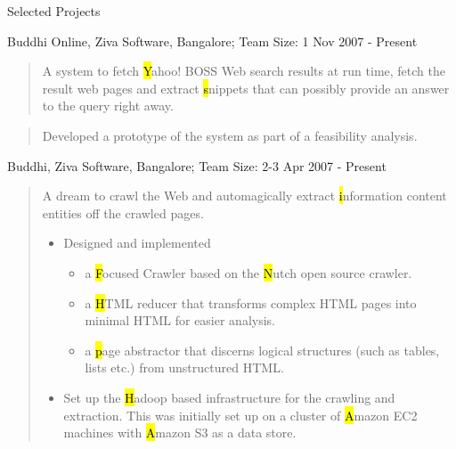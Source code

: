 \documentclass{resume}
\newcommand{\teamsize}{\sc\footnotesize Team Size: }
\begin{document}
\begin{category}{Selected Projects}{}

    \item {\topic Buddhi Online,} Ziva Software, Bangalore;
        {\teamsize 1}
        {\period Nov 2007 - Present}
        \begin{quotation}
            A system to fetch {\hl Yahoo! BOSS} Web search results at run time,
            fetch the result web pages and extract {\hl snippets} that can possibly
            provide an answer to the query right away.
        \end{quotation}
        \begin{quotation}
            Developed a prototype of the system as part of a feasibility analysis.
        \end{quotation}

    \item {\topic Buddhi,} Ziva Software, Bangalore;
        {\teamsize 2-3}
        {\period Apr 2007 - Present}
        \begin{quotation}
            A dream to crawl the Web and automagically extract {\hl information
            content entities} off the crawled pages.

            \begin{itemize}
                \item Designed and implemented
                    \begin{itemize}
                        \item a {\hl Focused Crawler} based on the {\hl Nutch} open
                            source crawler.
                        \item a {\hl HTML reducer} that transforms complex HTML
                            pages into minimal HTML for easier analysis.
                        \item a {\hl page abstractor} that discerns logical
                            structures (such as tables, lists etc.) from
                            unstructured HTML.
                    \end{itemize}
                \item Set up the {\hl Hadoop} based infrastructure for the crawling
                    and extraction.  This was initially set up on a cluster of {\hl
                    Amazon EC2} machines with {\hl Amazon S3} as a data store.
            \end{itemize}
        \end{quotation}


\end{category}
\end{document}
